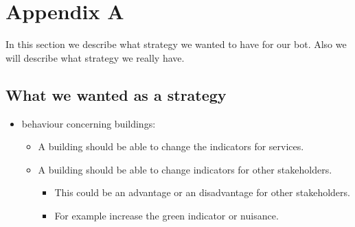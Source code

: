 \section{Appendix A}
In this section we describe what strategy we wanted to have for our bot. Also we will describe what strategy we really have.
\subsection{What we wanted as a strategy}
\begin{itemize}
	\item behaviour concerning buildings:
	\begin{itemize}
		\item  A building should be able to change the indicators for services.
		\item A building should be able to change indicators for other stakeholders.
		\begin{itemize}
			\item This could be an advantage or an disadvantage for other stakeholders.
			\item For example increase the green indicator or nuisance.
		\end{itemize}
	

\end{itemize}
\end{itemize}
